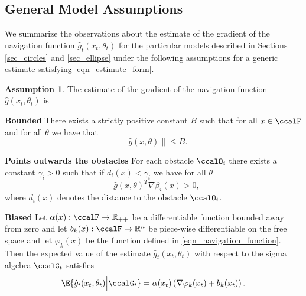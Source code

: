 \documentclass[article]{IEEEtran}
\theoremstyle{definition}
\newtheorem{assumption}{Assumption}
\begin{document}
\subsection{General Model Assumptions}\label{sec_general_assumptions}
We summarize the observations about the estimate of the gradient of the navigation function $\hat{g}_t(x_t,\theta_t)$ for the particular models described in Sections \ref{sec_circles} and \ref{sec_ellipse} under the following assumptions for a generic estimate satisfying \eqref{eqn_estimate_form}. 
%
\begin{assumption}\label{assumption_estimator_model}
The estimate of the gradient of the navigation function $\hat{g}(x_t,\theta_t)$ is 
%
\begin{mylist}
\item[\bf Bounded] There exists a strictly positive constant $B$ such that for all $x\in\ccalF$ and for all $\theta$ we have that 
%
\begin{equation}
\| \hat{g}(x,\theta)\| \leq B.
\end{equation}
%
\item[\bf Points outwards the obstacles]
For each obstacle $\ccalO_i$ there exists a constant $\gamma_i>0$ such that if $d_i(x) < \gamma_i$ we have for all $\theta$   
%
\begin{equation}
-\hat{g}(x,\theta)^T \nabla\beta_i(x)>0,
\end{equation}   
%
where $d_i(x)$ denotes the distance to the obstacle $\ccalO_i$.
\item[\bf Biased]
Let $\alpha(x):\ccalF\to \mathbb{R}_{++}$ be a differentiable function bounded away from zero and let $b_k(x):\ccalF\to\mathbb{R}^n$ be piece-wise differentiable on the free space and let $\varphi_k(x)$ be the function defined in \eqref{eqn_navigation_function}. Then the expected value of the estimate $\hat{g}_t(x_t,\theta_t)$ with respect to the sigma algebra $\ccalG_t$ satisfies 
%
\begin{equation}
\E{\hat{g}_t(x_t,\theta_t)\Big| \ccalG_t} = \alpha(x_t)\left(\nabla \varphi_k(x_t) + b_k(x_t)\right). 
\end{equation}
%
\end{mylist}
\end{assumption}
% 
\end{document}
